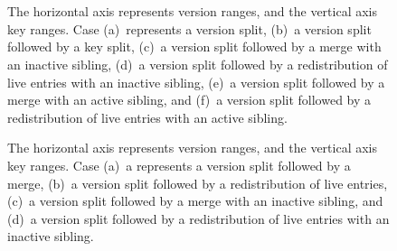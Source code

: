 \begin{figure}[!htb]
\begin{center}
  \\
  \\
  {The horizontal axis represents version ranges, and the vertical
  axis key ranges. 
  Case 
  (a)~represents a version split, 
  (b)~a version split followed by a key split,
  (c)~a version split followed by a merge with an inactive sibling, 
  (d)~a version split followed by a redistribution of live entries
  with an inactive sibling, 
  (e)~a version split followed by a merge with an active
  sibling, and 
  (f)~a version split followed by a redistribution of live entries
  with an active sibling.}
  \label{fig:split}
\end{center}
\end{figure}

\begin{figure}[!htb]
\begin{center}
  {The horizontal axis represents version ranges, and the vertical
  axis key ranges.
  Case
  (a)~a represents a version split followed by a merge,
  (b)~a version split followed by a redistribution of live entries,
  (c)~a version split followed by a merge with an inactive
  sibling, and
  (d)~a version split followed by a redistribution of live entries
  with an inactive sibling.}
  \label{fig:merge-inactive}
\end{center}
\end{figure}


